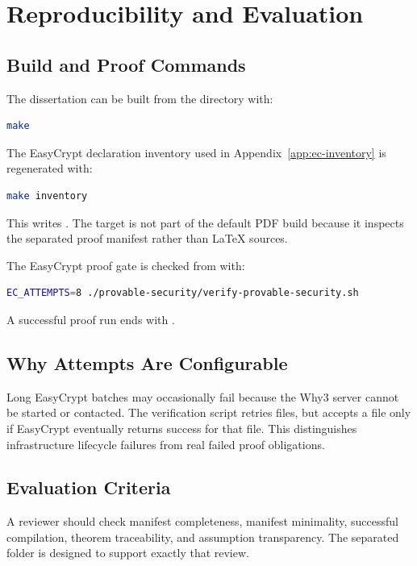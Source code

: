 \chapter{Reproducibility and Evaluation}
\label{ch:reproducibility}

\section{Build and Proof Commands}

The dissertation can be built from the  directory with:

\begin{lstlisting}[language=bash]
make
\end{lstlisting}

The EasyCrypt declaration inventory used in Appendix~\ref{app:ec-inventory} is
regenerated with:

\begin{lstlisting}[language=bash]
make inventory
\end{lstlisting}

This writes .  The target is not part
of the default PDF build because it inspects the separated proof manifest rather
than LaTeX sources.

The EasyCrypt proof gate is checked from  with:

\begin{lstlisting}[language=bash]
EC_ATTEMPTS=8 ./provable-security/verify-provable-security.sh
\end{lstlisting}

A successful proof run ends with .

\section{Why Attempts Are Configurable}

Long EasyCrypt batches may occasionally fail because the Why3 server cannot be
started or contacted.  The verification script retries files, but accepts a file
only if EasyCrypt eventually returns success for that file.  This distinguishes
infrastructure lifecycle failures from real failed proof obligations.

\section{Evaluation Criteria}

A reviewer should check manifest completeness, manifest minimality, successful
compilation, theorem traceability, and assumption transparency.  The separated
folder is designed to support exactly that review.
